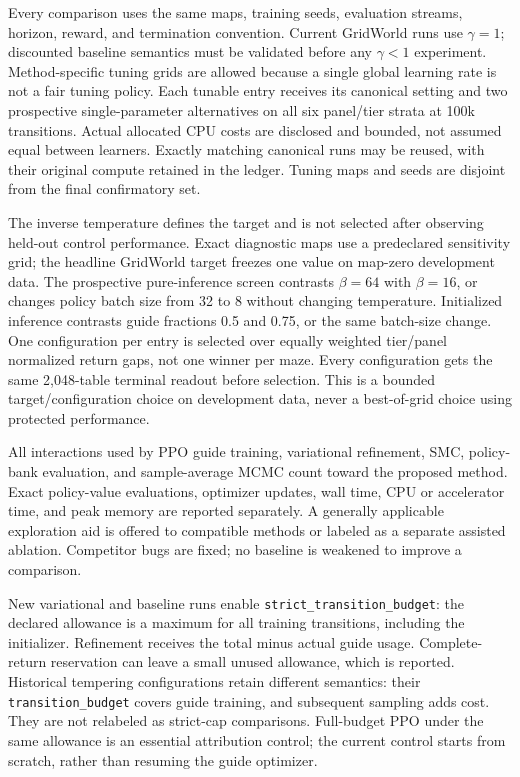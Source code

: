 
Every comparison uses the same maps, training seeds, evaluation streams,
horizon, reward, and termination convention.  Current GridWorld runs use
\(\gamma=1\); discounted baseline semantics must be validated before any
\(\gamma<1\) experiment.  Method-specific tuning grids are allowed because a
single global learning rate is not a fair tuning policy. Each tunable entry
receives its canonical setting and two prospective single-parameter alternatives
on all six panel/tier strata at 100k transitions. Actual allocated CPU costs are
disclosed and bounded, not assumed equal between learners. Exactly matching
canonical runs may be reused, with their original compute retained in the
ledger. Tuning maps and seeds
are disjoint from the final confirmatory set.

The inverse temperature defines the target and is not selected after observing
held-out control performance.  Exact diagnostic maps use a predeclared
sensitivity grid; the headline GridWorld target freezes one value on map-zero
development data. The prospective pure-inference screen contrasts \(\beta=64\)
with \(\beta=16\), or changes policy batch size from 32 to 8 without changing
temperature. Initialized inference contrasts guide fractions 0.5 and 0.75,
or the same batch-size change. One configuration per entry is selected over
equally weighted tier/panel normalized return gaps, not one winner per maze.
Every configuration gets the same 2,048-table terminal readout before selection.
This is a bounded target/configuration choice on development data, never a
best-of-grid choice using protected performance.

All interactions used by PPO guide training, variational refinement, SMC,
policy-bank evaluation, and sample-average MCMC count toward the proposed method.  Exact policy-value
evaluations, optimizer updates, wall time, CPU or accelerator time, and peak
memory are reported separately.  A generally applicable exploration aid is
offered to compatible methods or labeled as a separate assisted ablation.
Competitor bugs are fixed; no baseline is weakened to improve a comparison.

New variational and baseline runs enable \texttt{strict\_transition\_budget}:
the declared allowance is a maximum for all training transitions, including
the initializer. Refinement receives the total minus actual guide usage.
Complete-return reservation can leave a small unused allowance, which is
reported. Historical tempering configurations retain different semantics:
their \texttt{transition\_budget} covers guide training, and subsequent sampling
adds cost. They are not relabeled as strict-cap comparisons. Full-budget PPO
under the same allowance is an essential attribution control; the current
control starts from scratch, rather than resuming the guide optimizer.

